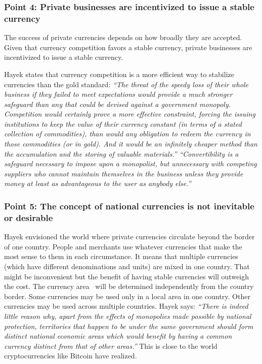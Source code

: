 \documentclass[dvipdfmx,a4paper]{article}
\begin{document}
\subsubsection*{Point 4: Private businesses are incentivized to issue a stable currency}

The success of private currencies depends on how broadly they are accepted. Given that currency competition favors a stable currency, private businesses are incentivized to issue a stable currency.

Hayek states that currency competition is a more efficient way to stabilize currencies than the gold standard: \textit{``The threat of the speedy loss of their whole business if they failed to meet expectations would provide a much stronger safeguard than any that could be devised against a government monopoly. Competition would certainly prove a more effective constraint, forcing the issuing institutions to keep the value of their currency constant (in terms of a stated collection of commodities), than would any obligation to redeem the currency in those commodities (or in gold). And it would be an infinitely cheaper method than the accumulation and the storing of valuable materials.''} \textit{``Convertibility is a safeguard necessary to impose upon a monopolist, but unnecessary with competing suppliers who cannot maintain themselves in the business unless they provide money at least as advantageous to the user as anybody else.''}

\subsubsection*{Point 5: The concept of national currencies is not inevitable or desirable}

Hayek envisioned the world where private currencies circulate beyond the border of one country. People and merchants use whatever currencies that make the most sense to them in each circumstance. It means that multiple currencies (which have different denominations and units) are mixed in one country. That might be inconvenient but the benefit of having stable currencies will outweigh the cost. The currency area~\cite{frankel1998endogenity} will be determined independently from the country border. Some currencies may be used only in a local area in one country. Other currencies may be used across multiple countries. Hayek says: \textit{``There is indeed little reason why, apart from the effects of monopolies made possible by national protection, territories that happen to be under the same government should form distinct national economic areas which would benefit by having a common currency distinct from that of other areas.''} This is close to the world cryptocurrencies like Bitcoin have realized.
\end{document}
